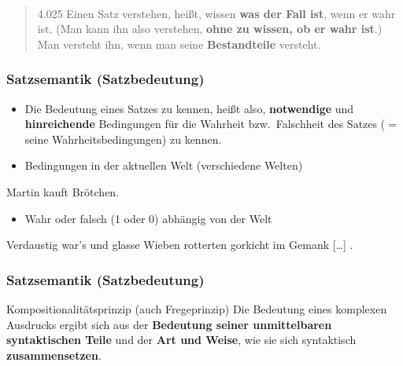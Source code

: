 \begin{frame}
\begin{minipage}{.3\textwidth}
\end{minipage}
~
\begin{minipage}{.65\textwidth}
	
	\begin{quote}
		4.025 Einen Satz verstehen, heißt, wissen \textbf{was der Fall ist}, wenn er wahr ist. (Man kann ihn also verstehen, \textbf{ohne zu wissen, ob er wahr ist}.) Man versteht ihn, wenn man seine \textbf{Bestandteile} versteht. 
	\end{quote}
	\hfill \citep{Wittgenstein72a}
	
\end{minipage}


\end{frame}



\begin{frame}
\frametitle{Satzsemantik (Satzbedeutung)}

\begin{itemize}
	\item Die Bedeutung eines Satzes zu kennen, heißt also, \textbf{notwendige} und \textbf{hinreichende} Bedingungen für die Wahrheit bzw.\ Falschheit des Satzes ($=$ seine Wahrheitsbedingungen) zu kennen.
	\medskip
	\item Bedingungen in der aktuellen Welt (verschiedene Welten)
\end{itemize}

\pause 
	
	\ea Martin kauft Brötchen.
	\z
	
\begin{itemize}	
	\item Wahr oder falsch (1 oder 0) \ras abhängig von der Welt
\end{itemize}

\pause 	
	
	\ea Verdaustig war's und glasse Wieben rotterten gorkicht im Gemank [\dots] \citep{SySt06a}.
	\z 
	


\end{frame}


\begin{frame}
\frametitle{Satzsemantik (Satzbedeutung)}

\begin{block}{Kompositionalitätsprinzip (auch Fregeprinzip)}
Die Bedeutung eines komplexen Ausdrucks ergibt sich aus der \textbf{Bedeutung seiner unmittelbaren syntaktischen Teile} und der \textbf{Art und Weise}, wie sie sich syntaktisch \textbf{zusammensetzen}.
\end{block}

\hfill \citep[vgl.][]{Partee19a}

\end{frame}


